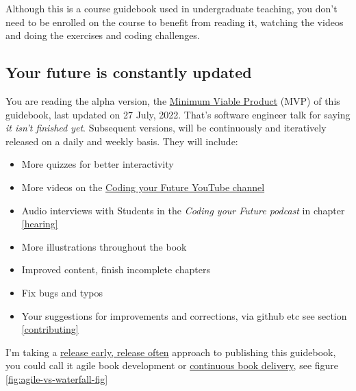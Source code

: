 \documentclass[
]{book}
\providecommand{\tightlist}{%
  \setlength{\itemsep}{0pt}\setlength{\parskip}{0pt}}
\begin{document}
Although this is a course guidebook used in undergraduate teaching, you don't need to be enrolled on the course to benefit from reading it, watching the videos and doing the exercises and coding challenges.

\hypertarget{version}{%
\subsection{Your future is constantly updated}\label{version}}

You are reading the alpha version, the \href{https://en.wikipedia.org/wiki/Minimum_viable_product}{Minimum Viable Product} (MVP) of this guidebook, last updated on 27 July, 2022. That's software engineer talk for saying \emph{it isn't finished yet}. Subsequent versions, will be continuously and iteratively released on a daily and weekly basis. They will include:

\begin{itemize}
\tightlist
\item
  More quizzes for better interactivity
\item
  More videos on the \href{https://www.youtube.com/channel/UCLBv_u8JmyUPqmRALIjVnLg}{Coding your Future YouTube channel}
\item
  Audio interviews with Students in the \emph{Coding your Future podcast} in chapter \ref{hearing}
\item
  More illustrations throughout the book
\item
  Improved content, finish incomplete chapters
\item
  Fix bugs and typos
\item
  Your suggestions for improvements and corrections, via github etc see section \ref{contributing}
\end{itemize}

I'm taking a \href{https://en.wikipedia.org/wiki/Release_early,_release_often}{release early, release often} \citep{Raymond1999} approach to publishing this guidebook, you could call it agile book development or \href{https://en.wikipedia.org/wiki/Continuous_delivery}{continuous book delivery}, see figure \ref{fig:agile-vs-waterfall-fig} \citep{realagile}
\end{document}
